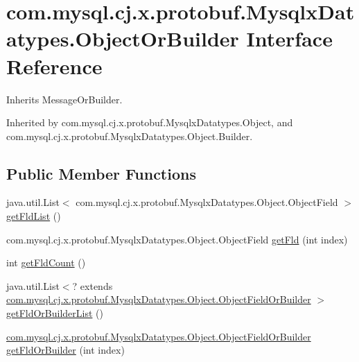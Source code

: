 \hypertarget{interfacecom_1_1mysql_1_1cj_1_1x_1_1protobuf_1_1_mysqlx_datatypes_1_1_object_or_builder}{}\section{com.\+mysql.\+cj.\+x.\+protobuf.\+Mysqlx\+Datatypes.\+Object\+Or\+Builder Interface Reference}
\label{interfacecom_1_1mysql_1_1cj_1_1x_1_1protobuf_1_1_mysqlx_datatypes_1_1_object_or_builder}


Inherits Message\+Or\+Builder.



Inherited by com.\+mysql.\+cj.\+x.\+protobuf.\+Mysqlx\+Datatypes.\+Object, and com.\+mysql.\+cj.\+x.\+protobuf.\+Mysqlx\+Datatypes.\+Object.\+Builder.

\subsection*{Public Member Functions}
\begin{DoxyCompactItemize}
\item 
java.\+util.\+List$<$ com.\+mysql.\+cj.\+x.\+protobuf.\+Mysqlx\+Datatypes.\+Object.\+Object\+Field $>$ \mbox{\hyperlink{interfacecom_1_1mysql_1_1cj_1_1x_1_1protobuf_1_1_mysqlx_datatypes_1_1_object_or_builder_a26e3682bb0a9e9825c9d8245afa95067}{get\+Fld\+List}} ()
\item 
com.\+mysql.\+cj.\+x.\+protobuf.\+Mysqlx\+Datatypes.\+Object.\+Object\+Field \mbox{\hyperlink{interfacecom_1_1mysql_1_1cj_1_1x_1_1protobuf_1_1_mysqlx_datatypes_1_1_object_or_builder_af0cb35851a1a32e4818426c39117bc9f}{get\+Fld}} (int index)
\item 
int \mbox{\hyperlink{interfacecom_1_1mysql_1_1cj_1_1x_1_1protobuf_1_1_mysqlx_datatypes_1_1_object_or_builder_af1d5452566f0e7a0e0dcac552495b9c0}{get\+Fld\+Count}} ()
\item 
java.\+util.\+List$<$? extends \mbox{\hyperlink{interfacecom_1_1mysql_1_1cj_1_1x_1_1protobuf_1_1_mysqlx_datatypes_1_1_object_1_1_object_field_or_builder}{com.\+mysql.\+cj.\+x.\+protobuf.\+Mysqlx\+Datatypes.\+Object.\+Object\+Field\+Or\+Builder}} $>$ \mbox{\hyperlink{interfacecom_1_1mysql_1_1cj_1_1x_1_1protobuf_1_1_mysqlx_datatypes_1_1_object_or_builder_a875d79fe453aa509490efd21f9b9edb8}{get\+Fld\+Or\+Builder\+List}} ()
\item 
\mbox{\hyperlink{interfacecom_1_1mysql_1_1cj_1_1x_1_1protobuf_1_1_mysqlx_datatypes_1_1_object_1_1_object_field_or_builder}{com.\+mysql.\+cj.\+x.\+protobuf.\+Mysqlx\+Datatypes.\+Object.\+Object\+Field\+Or\+Builder}} \mbox{\hyperlink{interfacecom_1_1mysql_1_1cj_1_1x_1_1protobuf_1_1_mysqlx_datatypes_1_1_object_or_builder_a660478ed753d040958bb07f2e7911c9c}{get\+Fld\+Or\+Builder}} (int index)
\end{DoxyCompactItemize}


